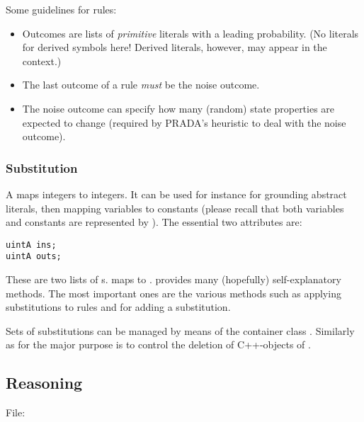\documentclass[10pt,twoside,twocolumn,fleqn]{article}
\begin{document}
Some guidelines for rules:
\begin{itemize}
\item Outcomes are lists of \emph{primitive} literals with a leading
probability. (No literals for derived symbols here! Derived literals,
however, may appear in the context.)
\item The last outcome of a rule \emph{must} be the noise outcome.
\item The noise outcome can specify how many (random) state properties
are expected to change (required by PRADA's heuristic to deal with the noise
outcome).
\end{itemize}


\subsubsection{Substitution}

A  maps integers to integers. It can be used for
instance for grounding abstract literals, then mapping variables to
constants (please recall that both variables and constants are represented
by ). The essential two attributes are:
\begin{lstlisting}
uintA ins;
uintA outs;
\end{lstlisting}
These are two lists of s.  maps to .
 provides many (hopefully) self-explanatory methods.
The most important ones are the various  methods such as
applying substitutions to rules and  for adding a substitution.

Sets of substitutions can be managed by means of the container class
. Similarly as for  the major purpose
is to control the deletion of C++-objects of .

  





\subsection{Reasoning}

File: \\
\end{document}
